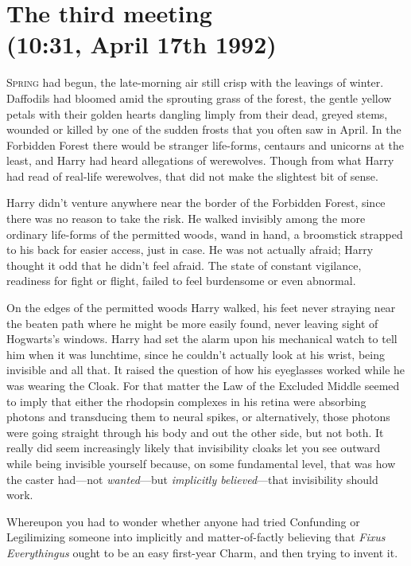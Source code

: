 
\section{The third meeting\\
(10:31\am, April 17th 1992)}

\lettrine{S}{pring} had begun, the late-morning air still crisp with the leavings of winter. Daffodils had bloomed amid the sprouting grass of the forest, the gentle yellow petals with their golden hearts dangling limply from their dead, greyed stems, wounded or killed by one of the sudden frosts that you often saw in April. In the Forbidden Forest there would be stranger life-forms, centaurs and unicorns at the least, and Harry had heard allegations of werewolves. Though from what Harry had read of real-life werewolves, that did not make the slightest bit of sense.

Harry didn't venture anywhere near the border of the Forbidden Forest, since there was no reason to take the risk. He walked invisibly among the more ordinary life-forms of the permitted woods, wand in hand, a broomstick strapped to his back for easier access, just in case. He was not actually afraid; Harry thought it odd that he didn't feel afraid. The state of constant vigilance, readiness for fight or flight, failed to feel burdensome or even abnormal.

On the edges of the permitted woods Harry walked, his feet never straying near the beaten path where he might be more easily found, never leaving sight of Hogwarts's windows. Harry had set the alarm upon his mechanical watch to tell him when it was lunchtime, since he couldn't actually look at his wrist, being invisible and all that. It raised the question of how his eyeglasses worked while he was wearing the Cloak. For that matter the Law of the Excluded Middle seemed to imply that either the rhodopsin complexes in his retina were absorbing photons and transducing them to neural spikes, or alternatively, those photons were going straight through his body and out the other side, but not both. It really did seem increasingly likely that invisibility cloaks let you see outward while being invisible yourself because, on some fundamental level, that was how the caster had—not \emph{wanted}—but \emph{implicitly believed}—that invisibility should work.

Whereupon you had to wonder whether anyone had tried Confunding or Legilimizing someone into implicitly and matter-of-factly believing that \emph{Fixus Everythingus} ought to be an easy first-year Charm, and then trying to invent it.

